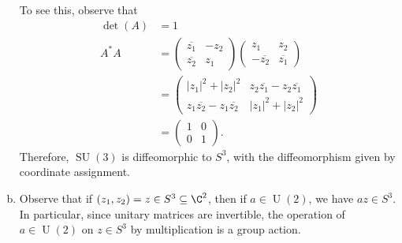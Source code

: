 \documentclass[10pt]{mypackage}
\begin{document}
\begin{solution}
\begin{enumerate}[(a)]
      To see this, observe that
      \begin{align*}
        \det\left( A \right) &= 1\\
        A^{\ast}A &= \begin{pmatrix} \overline{z_1} & -z_2\\ \overline{z_2} & z_1\end{pmatrix} \begin{pmatrix}z_1 & z_2 \\ - \overline{z_2} & \overline{z_1}\end{pmatrix}\\
                  &= \begin{pmatrix}\left\vert z_1 \right\vert^2 + \left\vert z_2 \right\vert^2 & z_2 \overline{z_1} - z_2 \overline{z_1}\\ z_1 \overline{z_2} - z_1 \overline{z_2} & \left\vert z_1 \right\vert^2 + \left\vert z_2 \right\vert^2\end{pmatrix}\\
                  &= \begin{pmatrix}1 & 0 \\ 0 & 1\end{pmatrix}.
      \end{align*}
      Therefore, $\operatorname{SU}(3)$ is diffeomorphic to $S^{3}$, with the diffeomorphism given by coordinate assignment.
    \item Observe that if $\left( z_1,z_2 \right) = z\in S^{3}\subseteq \C^{2}$, then if $a\in \operatorname{U}(2)$, we have $az\in S^{3}$. In particular, since unitary matrices are invertible, the operation of $a\in \operatorname{U}(2)$ on $z\in S^{3}$ by multiplication is a group action.\newline


\end{enumerate}
\end{solution}
\end{document}
